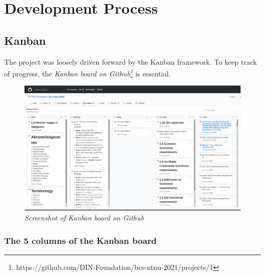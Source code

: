 \chapter{Development Process}




\section{Kanban}

The project was loosely driven forward by the Kanban framework. To keep track of progress, the \textit{Kanban board on Github\footnote{https://github.com/DIN-Foundation/bcs-ntnu-2021/projects/1}} is essential.

\begin{figure}[htbp]
  \centering
  \includegraphics[width=1\textwidth]{figures/github-kanban}
  \caption{\textit{Screenshot of Kanban board on Github}}
\end{figure}



\subsection{The 5 columns of the Kanban board}

